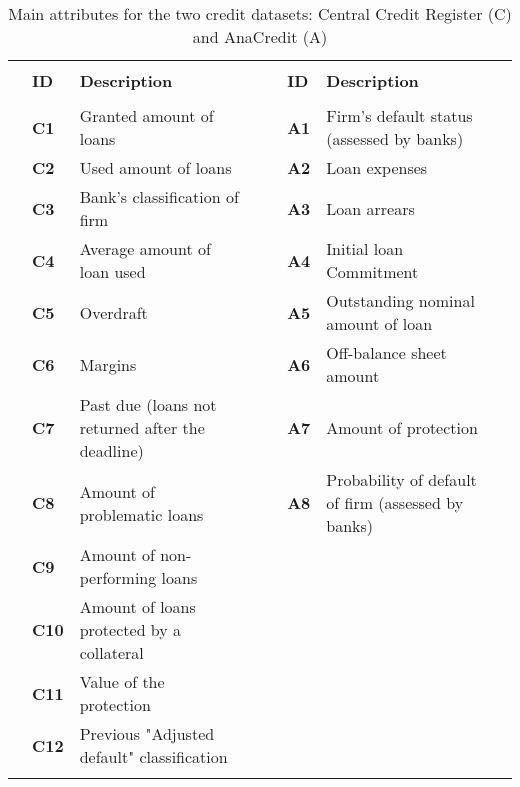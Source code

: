 \begin{table}
\small
\begin{center}
\begin{tabular}{ lllc | lllc }
\hline
& & & & & & &  \\
   &  \textbf{ID}       &\textbf{Description} &  & & \textbf{ID}       &\textbf{Description}   &\\
\hline
\hline
\\
&\textbf{C1}    &Granted amount of loans & & &\textbf{A1}  &Firm's default status (assessed by banks)   &  \\
&\textbf{C2}    &Used amount of loans & & &\textbf{A2}  &Loan expenses   &  \\
&\textbf{C3}    &Bank's classification of firm & & &\textbf{A3}  &Loan arrears   &  \\
&\textbf{C4}    &Average amount of loan used& & &\textbf{A4}  &Initial loan Commitment     & \\
&\textbf{C5}    &Overdraft & & &\textbf{A5}  &Outstanding nominal amount of loan    & \\
&\textbf{C6}    &Margins & & &\textbf{A6}  &Off-balance sheet amount     & \\
&\textbf{C7}    &Past due (loans not returned after the deadline) & & &\textbf{A7}  &Amount of protection   & \\
&\textbf{C8}    &Amount of problematic loans & & &\textbf{A8}  &Probability of default of firm (assessed by banks)  & \\
&\textbf{C9}    &Amount of non-performing loans & & &  &  & \\
&\textbf{C10}    &Amount of loans protected by a collateral & & &  &  & \\
&\textbf{C11}    &Value of the protection & & &  &  & \\
&\textbf{C12}    &Previous "Adjusted default" classification & & &  &  & \\
\hline
\\
\end{tabular}
\caption{Main attributes for the two credit datasets: Central Credit Register (C) and  AnaCredit (A)}
\label{tbl:attributes}
\end{center}
\end{table}


